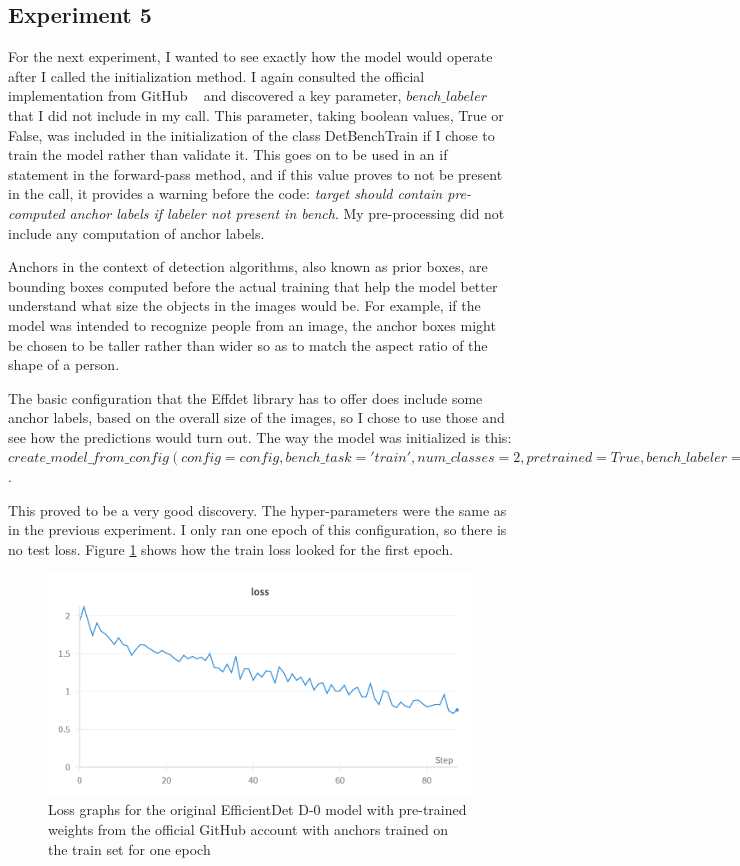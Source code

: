 \subsection{Experiment 5}

For the next experiment, I wanted to see exactly how the model would operate after I called the initialization method. I again consulted the official implementation from GitHub ~\cite{link7} and discovered a key parameter, $bench\_labeler$ that I did not include in my call. This parameter, taking boolean values, True or False, was included in the initialization of the class DetBenchTrain if I chose to train the model rather than validate it. This goes on to be used in an if statement in the forward-pass method, and if this value proves to not be present in the call, it provides a warning before the code: \textit{target should contain pre-computed anchor labels if labeler not present in bench}. My pre-processing did not include any computation of anchor labels.

Anchors in the context of detection algorithms, also known as prior boxes, are bounding boxes computed before the actual training that help the model better understand what size the objects in the images would be. For example, if the model was intended to recognize people from an image, the anchor boxes might be chosen to be taller rather than wider so as to match the aspect ratio of the shape of a person.~\cite{link11}

The basic configuration that the Effdet library has to offer does include some anchor labels, based on the overall size of the images, so I chose to use those and see how the predictions would turn out. The way the model was initialized is this: $create\_model\_from\_config(config=config, bench\_task='train', num\_classes=2, pretrained=True, bench\_labeler = True)$.

This proved to be a very good discovery. The hyper-parameters were the same as in the previous experiment. I only ran one epoch of this configuration, so there is no test loss. Figure \ref{fig:fig34} shows how the train loss looked for the first epoch.

\begin{figure}[H]
    \centering
    \includegraphics[width=0.5\linewidth]{figures/Figure43.png}
    \caption{Loss graphs for the original EfficientDet D-0 model with pre-trained weights from the official GitHub account with anchors trained on the train set for one epoch}
    \label{fig:fig34}
\end{figure}

